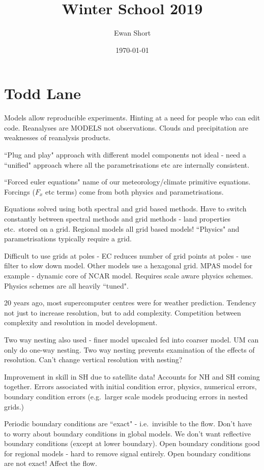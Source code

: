 \documentclass[12pt]{article}
\title{Winter School 2019}
\author{Ewan Short}
\date{\today}
\begin{document}
\maketitle

\section{Todd Lane}
Models allow reproducible experiments. Hinting at a need for people who can edit code. Reanalyses are MODELS not observations. Clouds and precipitation are weaknesses of reanalysis products. 

``Plug and play" approach with different model components not ideal - need a ``unified" approach where all the parametrisations etc are internally consistent. 

``Forced euler equations" name of our meteorology/climate primitive equations. Forcings ($F_x$ etc terms) come from both physics and parametrisations. 

Equations solved using both spectral and grid based methods. Have to switch constantly between spectral methods and grid methods - land properties etc.~stored on a grid. Regional models all grid based models! ``Physics" and parametrisations typically require a grid. 

Difficult to use grids at poles - EC reduces number of grid points at poles - use filter to slow down model. Other models use a hexagonal grid. MPAS model for example - dynamic core of NCAR model. Requires scale aware physics schemes. Physics schemes are all heavily ``tuned". 

20 years ago, most supercomputer centres were for weather prediction. Tendency not just to increase resolution, but to add complexity. Competition between complexity and resolution in model development. 

Two way nesting also used - finer model upscaled fed into coarser model. UM can only do one-way nesting. Two way nesting prevents examination of the effects of resolution. Can't change vertical resolution with nesting? 

Improvement in skill in SH due to satellite data! Accounts for NH and SH coming together. Errors associated with initial condition error, physics, numerical errors, boundary condition errors (e.g.~larger scale models producing errors in nested grids.)

Periodic boundary conditions are ``exact" - i.e.~invisible to the flow. Don't have to worry about boundary conditions in global models. We don't want reflective boundary conditions (except at lower boundary). Open boundary conditions good for regional models - hard to remove signal entirely. Open boundary conditions are not exact! Affect the flow.
\end{document}

